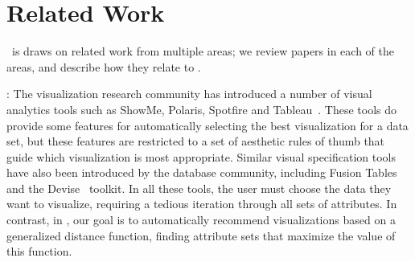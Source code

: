 

\section{Related Work}
\label{sec:related_work}
\SeeDB\ is draws on related work from multiple areas;
we review papers in each of the areas, and describe how they relate to
\SeeDB. 

:
The visualization 
research community has introduced a number of
visual analytics tools such as ShowMe, Polaris, Spotfire and 
Tableau~\cite{DBLP:journals/cacm/StolteTH08, DBLP:journals/tvcg/MackinlayHS07,spotfire}.
These tools do provide some features for automatically selecting
the best visualization for a data set, 
but these features are restricted to a set of aesthetic rules of thumb that
guide which visualization is most appropriate.
Similar visual specification tools 
have also been introduced by the
database community, including Fusion
Tables~\cite{DBLP:conf/sigmod/GonzalezHJLMSSG10} and the
Devise~\cite{DBLP:conf/sigmod/LivnyRBCDLMW97} toolkit. 
In all these tools, the user must choose the data they want to visualize, requiring
a tedious iteration through all sets of attributes.
In contrast, in \SeeDB, our goal is to automatically recommend visualizations
based on a generalized distance function, finding
attribute sets that maximize the value of this function.



